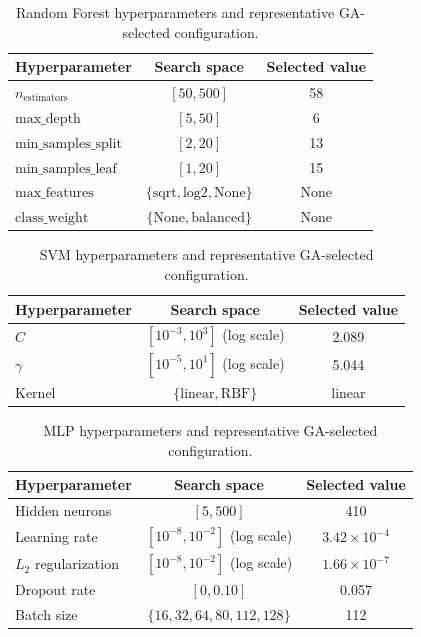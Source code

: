 \begin{table}[htbp]
\centering
\caption{Random Forest hyperparameters and representative GA-selected configuration.}
\label{tab:rf_hyperparameters}
\small
\begin{tabular}{lcc}\toprule
\textbf{Hyperparameter} & \textbf{Search space} & \textbf{Selected value}\\\midrule
$n_{\mathrm{estimators}}$ & $[50,500]$ & 58\\
$\mathrm{max\_depth}$ & $[5,50]$ & 6\\
$\mathrm{min\_samples\_split}$ & $[2,20]$ & 13\\
$\mathrm{min\_samples\_leaf}$ & $[1,20]$ & 15\\
$\mathrm{max\_features}$ & $\{\mathrm{sqrt},\mathrm{log2},\mathrm{None}\}$ & None\\
$\mathrm{class\_weight}$ & $\{\mathrm{None},\mathrm{balanced}\}$ & None\\\bottomrule
\end{tabular}
\end{table}

\begin{table}[htbp]
\centering
\caption{SVM hyperparameters and representative GA-selected configuration.}
\label{tab:svm_hyperparameters}
\small
\begin{tabular}{lcc}\toprule
\textbf{Hyperparameter} & \textbf{Search space} & \textbf{Selected value}\\\midrule
$C$ & $[10^{-3},10^{3}]$ (log scale) & 2.089\\
$\gamma$ & $[10^{-5},10^{1}]$ (log scale) & 5.044\\
Kernel & $\{\mathrm{linear},\mathrm{RBF}\}$ & linear\\\bottomrule
\end{tabular}
\end{table}

\begin{table}[htbp]
\centering
\caption{MLP hyperparameters and representative GA-selected configuration.}
\label{tab:mlp_hyperparameters}
\small
\begin{tabular}{lcc}\toprule
\textbf{Hyperparameter} & \textbf{Search space} & \textbf{Selected value}\\\midrule
Hidden neurons & $[5,500]$ & 410\\
Learning rate & $[10^{-8},10^{-2}]$ (log scale) & $3.42\times10^{-4}$\\
$L_2$ regularization & $[10^{-8},10^{-2}]$ (log scale) & $1.66\times10^{-7}$\\
Dropout rate & $[0,0.10]$ & 0.057\\
Batch size & $\{16,32,64,80,112,128\}$ & 112\\\bottomrule
\end{tabular}
\end{table}


